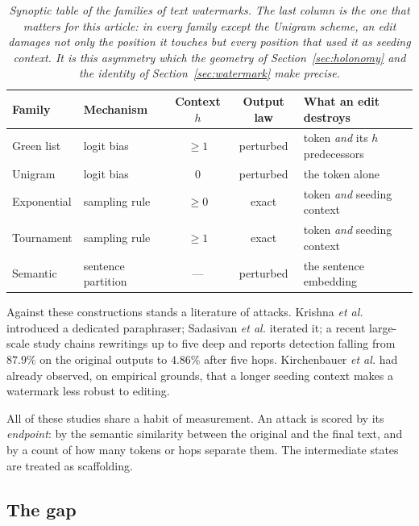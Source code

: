 \documentclass[11pt,a4paper]{article}
\theoremstyle{plain}
\theoremstyle{definition}
\numberwithin{equation}{section}
\begin{document}
\begin{table}[t]
\centering
\small
\begin{tabular}{llccl}
\toprule
Family & Mechanism & Context $h$ & Output law & What an edit destroys \\
\midrule
Green list \cite{KGW23} & logit bias & $\ge 1$ & perturbed &
  token \emph{and} its $h$ predecessors \\
Unigram \cite{Zhao24} & logit bias & $0$ & perturbed &
  the token alone \\
Exponential \cite{Kud24,CGZ24} & sampling rule & $\ge 0$ & exact &
  token \emph{and} seeding context \\
Tournament \cite{Dath24} & sampling rule & $\ge 1$ & exact &
  token \emph{and} seeding context \\
Semantic \cite{Hou24a} & sentence partition & --- & perturbed &
  the sentence embedding \\
\bottomrule
\end{tabular}
\caption{\emph{Synoptic table of the families of text watermarks. The
last column is the one that matters for this article: in every family
except the Unigram scheme, an edit damages not only the position it
touches but every position that used it as seeding context. It is this
asymmetry which the geometry of Section~\ref{sec:holonomy} and the
identity of Section~\ref{sec:watermark} make precise.}}
\label{tab:families}
\end{table}

Against these constructions stands a literature of attacks. Krishna
\emph{et al.} \cite{Kri23} introduced a dedicated paraphraser; Sadasivan
\emph{et al.} \cite{Sad23} iterated it; a recent large-scale study
\cite{Chain26} chains rewritings up to five deep and reports detection
falling from $87.9\%$ on the original outputs to $4.86\%$ after five
hops. Kirchenbauer \emph{et al.} \cite{KGW24} had already observed, on
empirical grounds, that a longer seeding context makes a watermark less
robust to editing.

All of these studies share a habit of measurement. An attack is scored
by its \emph{endpoint}: by the semantic similarity between the original
and the final text, and by a count of how many tokens or hops separate
them. The intermediate states are treated as scaffolding.

\subsection*{The gap}
\end{document}
